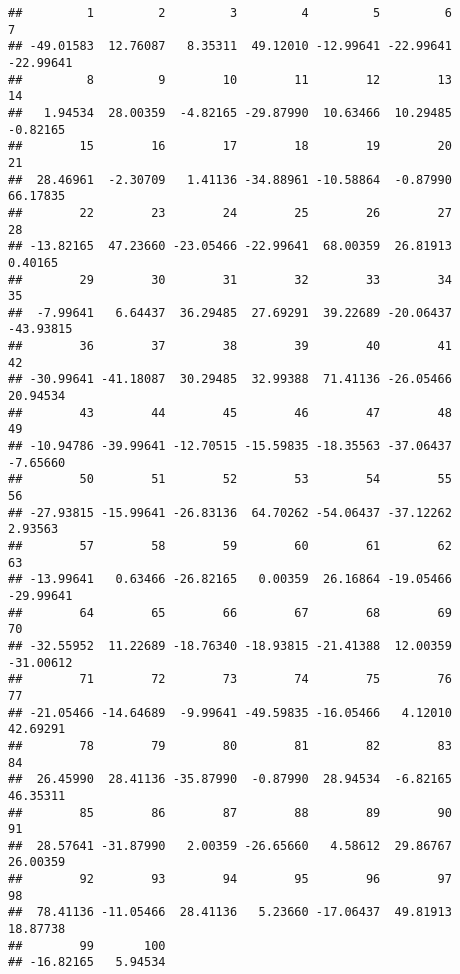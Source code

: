 \documentclass[]{book}
\newenvironment{Shaded}{\begin{snugshade}}{\end{snugshade}}
\newcommand{\KeywordTok}[1]{\textcolor[rgb]{0.13,0.29,0.53}{\textbf{#1}}}
\newcommand{\DataTypeTok}[1]{\textcolor[rgb]{0.13,0.29,0.53}{#1}}
\newcommand{\DecValTok}[1]{\textcolor[rgb]{0.00,0.00,0.81}{#1}}
\newcommand{\StringTok}[1]{\textcolor[rgb]{0.31,0.60,0.02}{#1}}
\newcommand{\CommentTok}[1]{\textcolor[rgb]{0.56,0.35,0.01}{\textit{#1}}}
\newcommand{\OperatorTok}[1]{\textcolor[rgb]{0.81,0.36,0.00}{\textbf{#1}}}
\newcommand{\NormalTok}[1]{#1}
\theoremstyle{definition}
\theoremstyle{definition}
\theoremstyle{definition}
\theoremstyle{remark}
\begin{document}
\begin{verbatim}
##         1         2         3         4         5         6         7 
## -49.01583  12.76087   8.35311  49.12010 -12.99641 -22.99641 -22.99641 
##         8         9        10        11        12        13        14 
##   1.94534  28.00359  -4.82165 -29.87990  10.63466  10.29485  -0.82165 
##        15        16        17        18        19        20        21 
##  28.46961  -2.30709   1.41136 -34.88961 -10.58864  -0.87990  66.17835 
##        22        23        24        25        26        27        28 
## -13.82165  47.23660 -23.05466 -22.99641  68.00359  26.81913   0.40165 
##        29        30        31        32        33        34        35 
##  -7.99641   6.64437  36.29485  27.69291  39.22689 -20.06437 -43.93815 
##        36        37        38        39        40        41        42 
## -30.99641 -41.18087  30.29485  32.99388  71.41136 -26.05466  20.94534 
##        43        44        45        46        47        48        49 
## -10.94786 -39.99641 -12.70515 -15.59835 -18.35563 -37.06437  -7.65660 
##        50        51        52        53        54        55        56 
## -27.93815 -15.99641 -26.83136  64.70262 -54.06437 -37.12262   2.93563 
##        57        58        59        60        61        62        63 
## -13.99641   0.63466 -26.82165   0.00359  26.16864 -19.05466 -29.99641 
##        64        65        66        67        68        69        70 
## -32.55952  11.22689 -18.76340 -18.93815 -21.41388  12.00359 -31.00612 
##        71        72        73        74        75        76        77 
## -21.05466 -14.64689  -9.99641 -49.59835 -16.05466   4.12010  42.69291 
##        78        79        80        81        82        83        84 
##  26.45990  28.41136 -35.87990  -0.87990  28.94534  -6.82165  46.35311 
##        85        86        87        88        89        90        91 
##  28.57641 -31.87990   2.00359 -26.65660   4.58612  29.86767  26.00359 
##        92        93        94        95        96        97        98 
##  78.41136 -11.05466  28.41136   5.23660 -17.06437  49.81913  18.87738 
##        99       100 
## -16.82165   5.94534
\end{verbatim}

\begin{Shaded}
\end{Shaded}
\end{document}
